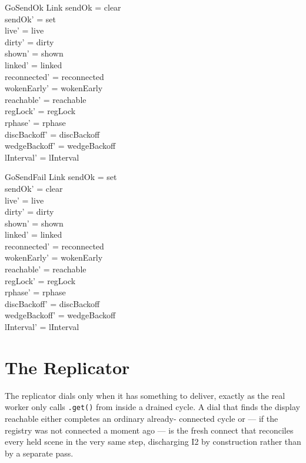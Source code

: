 \documentclass[a4paper,10pt,fleqn]{article}
\begin{document}
\begin{schema}{GoSendOk}
  \Delta Link
\where
  sendOk = clear \\
  sendOk' = set \\
  live' = live \\ dirty' = dirty \\ shown' = shown \\
  linked' = linked \\ reconnected' = reconnected \\
  wokenEarly' = wokenEarly \\ reachable' = reachable \\
  regLock' = regLock \\ rphase' = rphase \\
  discBackoff' = discBackoff \\ wedgeBackoff' = wedgeBackoff \\
  lInterval' = lInterval
\end{schema}

\begin{schema}{GoSendFail}
  \Delta Link
\where
  sendOk = set \\
  sendOk' = clear \\
  live' = live \\ dirty' = dirty \\ shown' = shown \\
  linked' = linked \\ reconnected' = reconnected \\
  wokenEarly' = wokenEarly \\ reachable' = reachable \\
  regLock' = regLock \\ rphase' = rphase \\
  discBackoff' = discBackoff \\ wedgeBackoff' = wedgeBackoff \\
  lInterval' = lInterval
\end{schema}

\section{The Replicator}

The replicator dials only when it has something to deliver, exactly as the
real worker only calls \texttt{.get()} from inside a drained cycle.  A dial
that finds the display reachable either completes an ordinary already-
connected cycle or --- if the registry was not connected a moment ago ---
is the fresh connect that reconciles every held scene in the very same
step, discharging I2 by construction rather than by a separate pass.
\end{document}
